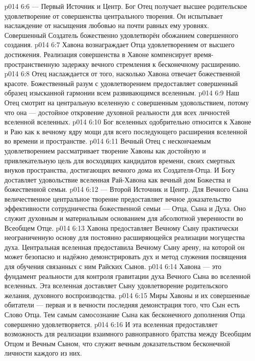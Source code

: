 \vs p014 6:6  --- Первый Источник и Центр. Бог Отец получает высшее родительское удовлетворение от совершенства центрального творения. Он испытывает наслаждение от насыщения любовью на почти равных ему уровнях. Совершенный Создатель божественно удовлетворён обожанием совершенного создания.
\vs p014 6:7 Хавона вознаграждает Отца удовлетворением от высшего достижения. Реализация совершенства в Хавоне компенсирует время\hyp{}пространственную задержку вечного стремления к бесконечному расширению.
\vs p014 6:8 Отец наслаждается от того, насколько Хавона отвечает божественной красоте. Божественный разум с удовлетворением предоставляет совершенный образец изысканной гармонии всем развивающимся вселенным.
\vs p014 6:9 Наш Отец смотрит на центральную вселенную с совершенным удовольствием, потому что она --- достойное откровение духовной реальности для всех личностей вселенной вселенных.
\vs p014 6:10 Бог вселенных одобрительно относится к Хавоне и Раю как к вечному ядру мощи для всего последующего расширения вселенной во времени и пространстве.
\vs p014 6:11 Вечный Отец с нескончаемым удовлетворением рассматривает творение Хавоны как достойную и привлекательную цель для восходящих кандидатов времени, своих смертных внуков пространства, достигающих вечного дома их Создателя\hyp{}Отца. И Богу доставляет удовольствие вселенная Рай\hyp{}Хавона как вечный дом Божества и божественной семьи.
\vs p014 6:12  --- Второй Источник и Центр. Для Вечного Сына величественное центральное творение предоставляет вечное доказательство эффективности сотрудничества божественной семьи --- Отца, Сына и Духа. Оно служит духовным и материальным основанием для абсолютной уверенности во Всеобщем Отце.
\vs p014 6:13 Хавона предоставляет Вечному Сыну практически неограниченную основу для постоянно расширяющейся реализации могущества духа. Центральная вселенная предоставила Вечному Сыну арену, на которой он может безопасно и надёжно демонстрировать дух и метод служения посвящения для обучения связанных с ним Райских Сынов.
\vs p014 6:14 Хавона --- это фундамент реальности для контроля гравитации духа Вечного Сына во вселенной вселенных. Эта вселенная доставляет Сыну удовлетворение родительского желания, духовного воспроизводства.
\vs p014 6:15 Миры Хавоны и их совершенные обитатели --- первая и в вечности последняя демонстрация того, что Сын есть Слово Отца. Тем самым самосознание Сына как бесконечного дополнения Отца совершенно удовлетворяется.
\vs p014 6:16 И эта вселенная предоставляет возможность для реализации взаимного равноправного братства между Всеобщим Отцом и Вечным Сыном, что служит вечным доказательством бесконечной личности каждого из них.
